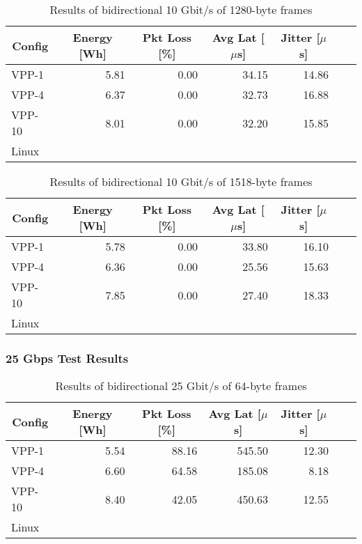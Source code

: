 \begin{table}[h!]
\centering
\caption{Results of bidirectional 10 Gbit/s of 1280-byte frames}
\begin{tabular}{|l|r|r|r|r|r|r|}
\hline
\multicolumn{1}{|c|}{\textbf{Config}} &
\multicolumn{1}{c|}{\textbf{Energy [Wh] }} &
\multicolumn{1}{c|}{\textbf{Pkt Loss [\%]}} &
\multicolumn{1}{c|}{\textbf{Avg Lat [$\mu$s]}} &
\multicolumn{1}{c|}{\textbf{Jitter [$\mu$s]}} \\
\hline 
VPP-1 & 5.81 & 0.00 & 34.15 & 14.86 \\
VPP-4 & 6.37 & 0.00 & 32.73 & 16.88 \\
VPP-10 & 8.01 & 0.00 & 32.20 & 15.85 \\
Linux &  &  &  &  \\
\hline
\end{tabular}
\label{tab:10budp:1280B}
\end{table}

\begin{table}[h!]
\centering
\caption{Results of bidirectional 10 Gbit/s of 1518-byte frames}
\begin{tabular}{|l|r|r|r|r|r|r|}
\hline
\multicolumn{1}{|c|}{\textbf{Config}} &
\multicolumn{1}{c|}{\textbf{Energy [Wh] }} &
\multicolumn{1}{c|}{\textbf{Pkt Loss [\%]}} &
\multicolumn{1}{c|}{\textbf{Avg Lat [$\mu$s]}} &
\multicolumn{1}{c|}{\textbf{Jitter [$\mu$s]}} \\
\hline 
VPP-1 & 5.78 & 0.00 & 33.80 & 16.10 \\
VPP-4 & 6.36 & 0.00 & 25.56 & 15.63 \\
VPP-10 & 7.85 & 0.00 & 27.40 & 18.33 \\
Linux &  &  &  &  \\
\hline
\end{tabular}
\label{tab:10budp:1518B}
\end{table}


\subsubsection{25 Gbps Test Results}

\begin{table}[h!]
\centering
\caption{Results of bidirectional 25 Gbit/s of 64-byte frames}
\begin{tabular}{|l|r|r|r|r|r|r|}
\hline
\multicolumn{1}{|c|}{\textbf{Config}} &
\multicolumn{1}{c|}{\textbf{Energy [Wh] }} &
\multicolumn{1}{c|}{\textbf{Pkt Loss [\%]}} &
\multicolumn{1}{c|}{\textbf{Avg Lat [$\mu$s]}} &
\multicolumn{1}{c|}{\textbf{Jitter [$\mu$s]}} \\
\hline 
VPP-1 & 5.54 & 88.16 & 545.50 & 12.30 \\
VPP-4 & 6.60 & 64.58 & 185.08 & 8.18  \\
VPP-10 & 8.40 & 42.05 & 450.63 & 12.55 \\
Linux &  &  &  &  \\
\hline
\end{tabular}
\label{tab:25budp:64B}
\end{table}


